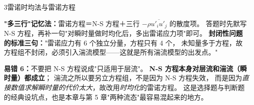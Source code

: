 \begin{kaodian}{3}{雷诺时均法与雷诺方程}
\begin{banfa}
\textbf{"多三行"记忆法：}雷诺方程＝N-S 方程＋三行 $-\rho\overline{u'_iu'_j}$ 的散度项。
答题时先默写 N-S 方程，再补一句"对瞬时量做时均化后，多出雷诺应力项"即可。
\textbf{封闭性问题的标准三句：}"雷诺应力有 6 个独立分量，方程只有 4 个，
未知量多于方程，故方程组不封闭，必须引入湍流模型——这就是所有湍流模型的出发点。"
\end{banfa}

\begin{yicuo}
\textbf{易错 6：}不要把 N-S 方程说成"只适用于层流"。
\textbf{N-S 方程本身对层流和湍流（瞬时量）都成立}；
湍流之所以要另立方程组，不是因为 N-S 方程失效，
而是因为\emph{直接数值求解瞬时量的代价太大}，故改用\emph{时均化}的雷诺方程。
这是选择题与判断题的经典设坑点，也是本章与第 5 章"两种流态"最容易混起来的地方。
\end{yicuo}
\end{kaodian}

